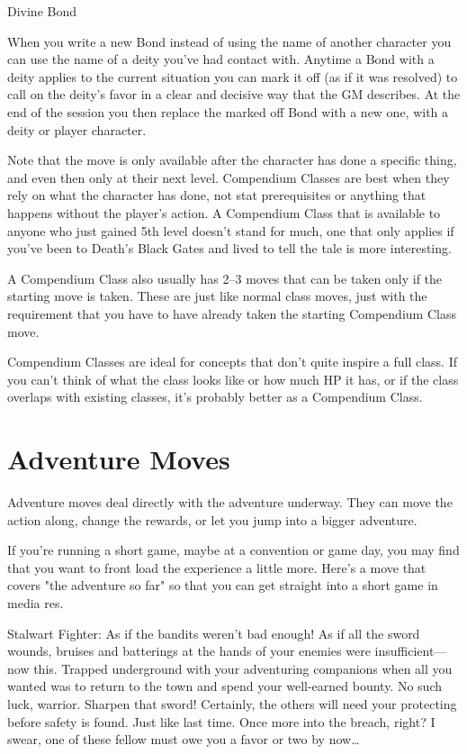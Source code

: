 \startExample
Divine Bond
\stopExample
 
\startExample
When you write a new Bond instead of using the name of another character you can use the name of a deity you've had contact with. Anytime a Bond with a deity applies to the current situation you can mark it off (as if it was resolved) to call on the deity's favor in a clear and decisive way that the GM describes. At the end of the session you then replace the marked off Bond with a new one, with a deity or player character.
\stopExample
 

Note that the move is only available after the character has done a specific thing, and even then only at their next level. Compendium Classes are best when they rely on what the character has done, not stat prerequisites or anything that happens without the player's action. A Compendium Class that is available to anyone who just gained 5th level doesn't stand for much, one that only applies if you've been to Death's Black Gates and lived to tell the tale is more interesting.

 

A Compendium Class also usually has 2–3 moves that can be taken only if the starting move is taken. These are just like normal class moves, just with the requirement that you have to have already taken the starting Compendium Class move.

 

Compendium Classes are ideal for concepts that don't quite inspire a full class. If you can't think of what the class looks like or how much HP it has, or if the class overlaps with existing classes, it's probably better as a Compendium Class.

 
\section{Adventure Moves}    
 

Adventure moves deal directly with the adventure underway. They can move the action along, change the rewards, or let you jump into a bigger adventure.

 

If you're running a short game, maybe at a convention or game day, you may find that you want to front load the experience a little more. Here's a move that covers "the adventure so far" so that you can get straight into a short game in media res.

 
\startExample
Stalwart Fighter: As if the bandits weren’t bad enough! As if all the sword wounds, bruises and batterings at the hands of your enemies were insufficient—now this. Trapped underground with your adventuring companions when all you wanted was to return to the town and spend your well-earned bounty. No such luck, warrior. Sharpen that sword! Certainly, the others will need your protecting before safety is found. Just like last time. Once more into the breach, right? I swear, one of these fellow must owe you a favor or two by now…
\stopExample
 
